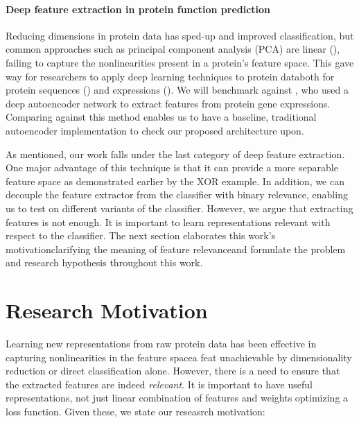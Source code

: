 \paragraph{Deep feature extraction in protein function prediction}
Reducing dimensions in protein data has sped-up and improved classification,
but common approaches such as principal component analysis (PCA) are linear
(\cite{bengio2013representation}), failing to capture the nonlinearities
present in a protein's feature space. This gave way for researchers to apply
deep learning techniques to protein data\textemdash both for protein
sequences (\cite{bhola2014machine,kulmanov2017deepgo, zou2017protein}) and
expressions (\cite{baldi2001bioinformatics, chicco2014deep}). We
will benchmark against \cite{chicco2014deep}, who used a deep autoencoder
network to extract features from protein gene expressions. Comparing against
this method enables us to have a baseline, traditional autoencoder
implementation to check our proposed architecture upon.

\par As mentioned, our work falls under the last category of deep feature
extraction. One major advantage of this technique is that it can provide a
more separable feature space as demonstrated earlier by the XOR example. In
addition, we can decouple the feature extractor from the classifier with
binary relevance, enabling us to test on different variants of the
classifier. However, we argue that extracting features is not enough. It is
important to learn representations relevant with respect to the classifier.
The next section elaborates this work's motivation\textemdash clarifying the
meaning of feature relevance\textemdash and formulate the problem and
research hypothesis throughout this work.

\section{Research Motivation}
\label{Motivation}

\par Learning new representations from raw protein data has been effective in
capturing nonlinearities in the feature space\textemdash a feat unachievable
by dimensionality reduction or direct classification alone. However, there is
a need to ensure that the extracted features are indeed \textit{relevant}. It
is important to have useful representations, not just linear combination of
features and weights optimizing a loss function. Given these, we state our
reseasrch motivation:


